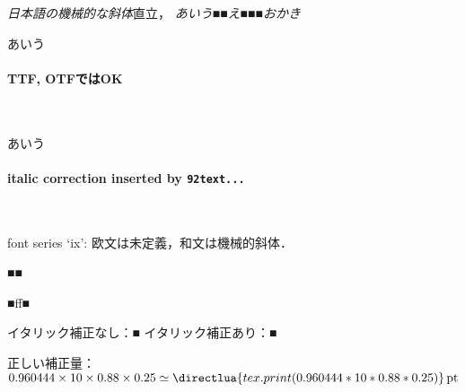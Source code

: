 \documentclass{article}
\begin{document}
\textsl{日本語の機械的な斜体}直立，
\textsl{あいう■\textup{■え■■}■おかき}

{\selectfont あいう}

\paragraph{TTF, OTFではOK}\ 


{\selectfont あいう}

\paragraph{italic correction inserted by {\tt\char92text...}}\

font series `ix': 欧文は未定義，和文は機械的斜体．

{\gt■■}

{\gt■ff■}

イタリック補正なし：{■}
イタリック補正あり：{■}


\bigskip

正しい補正量：$0.960444\times 10 \times 0.88\times 0.25 \simeq
\directlua{tex.print(0.960444*10*0.88*0.25)}\,\textrm{pt}$
\end{document}
